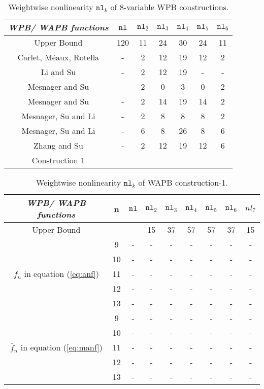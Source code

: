 \documentclass{article}[12pt]
\newcommand{\nl}{\mathtt{nl}}
\begin{document}
\begin{table}
	\centering
	\begin{tabular}{ | c | c | c | c | c | c | c | }
		\hline
		\textit{WPB/ WAPB functions} & $\nl$ & $\nl_2$ & $\nl_3$ & $\nl_4$ & $\nl_5$ & $\nl_6$ \\
		\hline
	    Upper Bound \cite{CMR17} & 120  & 11 & 24  & 30  & 24 & 11 \\ 
	    Carlet, M{\'{e}}aux, Rotella \cite{CMR17} & - & 2 & 12 & 19 & 12 & 2 \\
		Li and Su \cite[$g_{2^{q+2}}$ equation(9)]{LS20} & - & 2 & 12 & 19 & - & - \\
		Mesnager and Su \cite[$f_m$ equation(13)]{MS21} & - & 2 & 0 & 3 & 0 & 2 \\
		Mesnager and Su \cite[$g_m$ equation(22)]{MS21} & - & 2 & 14 & 19 & 14 & 2 \\
		Mesnager, Su and Li \cite[$f_m$ equation(2) ]{MSL21} & - & 2 & 8 & 8 & 8 & 2 \\
		Mesnager, Su and Li \cite[$f_m$ equation(3) ]{MSL21} & - & 6 & 8 & 26 & 8 & 6 \\
		Zhang and Su \cite[$g_m$ equation(11)]{ZSu23}  & - & 2 & 12 & 19 & 12 & 6 \\ 
		Construction 1 &   &  &  &  &   & \\
		\hline
	\end{tabular}
    	\caption{Weightwise nonlinearity $\nl_k$ of 8-variable WPB constructions.}
    	\label{table:3}
\end{table}


\begin{table}
	\centering
	\begin{tabular}{ |c|c|c|c|c|c|c|c|c| }
	\hline
	\textit{WPB/ WAPB functions}& n  & $\nl$ & $\nl_2$ & $\nl_3$ & $\nl_4$ & $\nl_5$ & $\nl_6$ & $nl_7$ \\
	\hline
	Upper Bound \cite{CMR17} &  &  &  15 & 37  &  57   &  57  & 37 & 15  \\ 
	\hline
	\multirow{5}{*}{$f_n$ in equation (\ref{eq:anf})} & 9 & - & - & - & - & - & - & - \\
	               & 10 & - & - & - & - & - &	- & - \\
	               & 11 & - & - & - & - & - &  - & -  \\
	               & 12 & - & - & - & - & - & -  & -  \\
	               & 13 & - & - & - & - & - & -  & -  \\ 
	\hline
	\multirow{5}{*}{$\bar{f}_n$ in equation (\ref{eq:manf})} & 9 & - & - & - & - & - & - & - \\
	& 10 & - & - & - & - & - &	- & - \\
	& 11 & - & - & - & - & - &  - & -  \\
	& 12 & - & - & - & - & - & -  & -  \\
	& 13 & - & - & - & - & - & -  & -  \\ 
	\hline
\end{tabular}
\caption{Weightwise nonlinearity $\nl_k$ of WAPB construction-1.}
\label{table:4}
\end{table}
\end{document}
